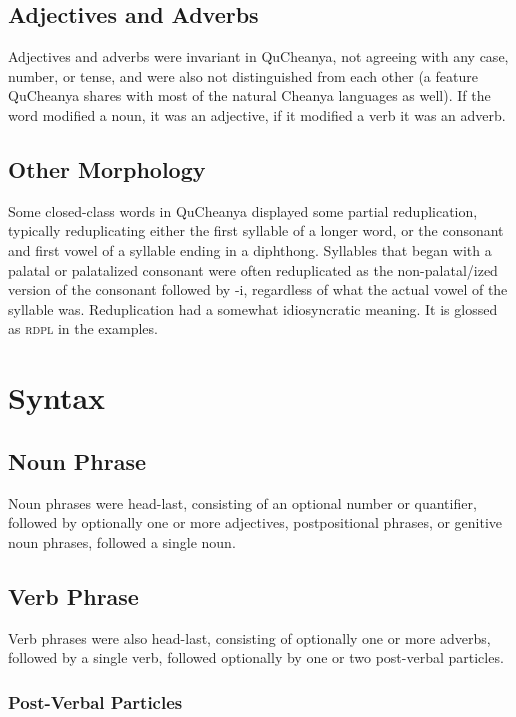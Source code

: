 \documentclass{article}
\begin{document}
\subsection{Adjectives and Adverbs}

Adjectives and adverbs were invariant in QuCheanya, not agreeing with any case, number, or tense, and were also not distinguished from each other (a feature QuCheanya shares with most of the natural Cheanya languages as well).  If the word modified a noun, it was an adjective, if it modified a verb it was an adverb.

\subsection{Other Morphology}

Some closed-class words in QuCheanya displayed some partial reduplication, typically reduplicating either the first syllable of a longer word, or the consonant and first vowel of a syllable ending in a diphthong.  Syllables that began with a palatal or palatalized consonant were often reduplicated as the non-palatal/ized version of the consonant followed by -i, regardless of what the actual vowel of the syllable was.  Reduplication had a somewhat idiosyncratic meaning.  It is glossed as \textsc{rdpl} in the examples.

\section{Syntax}
\subsection{Noun Phrase}

Noun phrases were head-last, consisting of an optional number or quantifier, followed by optionally one or more adjectives, postpositional phrases, or genitive noun phrases, followed a single noun.  

\subsection{Verb Phrase}

Verb phrases were also head-last, consisting of optionally one or more adverbs, followed by a single verb, followed optionally by one or two post-verbal particles.

\subsubsection{Post-Verbal Particles}
\end{document}
